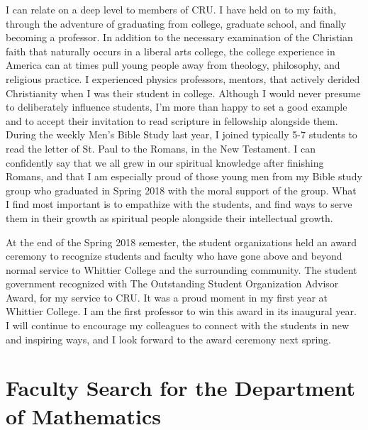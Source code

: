 \documentclass[../main.tex]{subfiles}
\begin{document}
I can relate on a deep level to members of CRU.  I have held on to my faith, through the adventure of graduating from college, graduate school, and finally becoming a professor.  In addition to the necessary examination of the Christian faith that naturally occurs in a liberal arts college, the college experience in America can at times pull young people away from theology, philosophy, and religious practice.  I experienced physics professors, mentors, that actively derided Christianity when I was their student in college.  Although I would never presume to deliberately influence students, I'm more than happy to set a good example and to accept their invitation to read scripture in fellowship alongside them.  During the weekly Men's Bible Study last year, I joined typically 5-7 students to read the letter of St. Paul to the Romans, in the New Testament.  I can confidently say that we all grew in our spiritual knowledge after finishing Romans, and that I am especially proud of those young men from my Bible study group who graduated in Spring 2018 with the moral support of the group.  What I find most important is to empathize with the students, and find ways to serve them in their growth as spiritual people alongside their intellectual growth. \\ \hspace{0.1cm}

At the end of the Spring 2018 semester, the student organizations held an award ceremony to recognize students and faculty who have gone above and beyond normal service to Whittier College and the surrounding community.  The student government recognized with The Outstanding Student Organization Advisor Award, for my service to CRU.  It was a proud moment in my first year at Whittier College.  I am the first professor to win this award in its inaugural year.  I will continue to encourage my colleagues to connect with the students in new and inspiring ways, and I look forward to the award ceremony next spring. \\ \hspace{0.1cm}

\section{Faculty Search for the Department of Mathematics}
\end{document}
